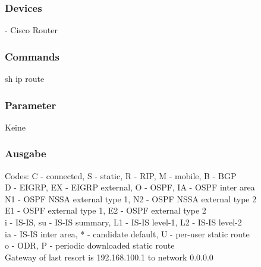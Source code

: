 \documentclass[a4,12pt]{scrartcl}
\begin{document}
\subsubsection{Devices}
- Cisco Router
\subsubsection{Commands}
sh ip route
\subsubsection{Parameter}
Keine
\subsubsection{Ausgabe}
Codes: C - connected, S - static, R - RIP, M - mobile, B - BGP\\
       D - EIGRP, EX - EIGRP external, O - OSPF, IA - OSPF inter area\\
       N1 - OSPF NSSA external type 1, N2 - OSPF NSSA external type 2\\
       E1 - OSPF external type 1, E2 - OSPF external type 2\\
       i - IS-IS, su - IS-IS summary, L1 - IS-IS level-1, L2 - IS-IS level-2\\
       ia - IS-IS inter area, * - candidate default, U - per-user static route\\
       o - ODR, P - periodic downloaded static route\\

\noindent Gateway of last resort is 192.168.100.1 to network 0.0.0.0\\
\end{document}

